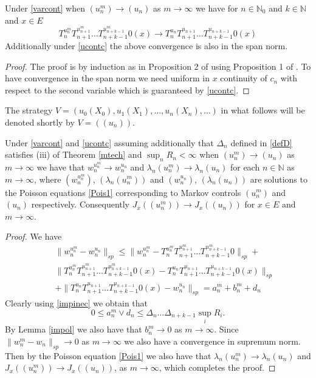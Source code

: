 \documentclass[10pt,english]{extarticle}
\begin{document}
\begin{lemma}\label{impol}
Under \eqref{varcont}  when $(u_n^m)\to (u_n)$ as $m\to \infty$ we have for $n\in \mathbb{N}_0$ and $k\in \mathbb{N}$ and $x\in E$
\begin{equation}
T_n^{u_n^m}T_{n+1}^{u_{n+1}^m}\ldots T_{n+k-1}^{u_{n+k-1}^m}0(x) \to T_n^{u_n}T_{n+1}^{u_{n+1}}\ldots T_{n+k-1}^{u_{n+k-1}}0(x)
\end{equation}
Additionally under \eqref{ucontc} the above convergence is also in the span norm.
\end{lemma}
\begin{proof} The proof is by induction as in Proposition 2 of \cite{Ste2024} using Proposition 1 of \cite{Ste2024}. To have convergence in the span norm we need uniform in $x$ continuity of $c_n$ with respect to the second variable which is guaranteed by \eqref{ucontc}.
\end{proof}
The strategy $V=(u_0(X_0),u_1(X_1),\ldots,u_n(X_n),\ldots)$ in what follows will be denoted shortly by $V=((u_n))$.
\begin{theorem} Under \eqref{varcont} and \eqref{ucontc} assuming additionally that $\Delta_n$ defined in \eqref{defD} satisfies (iii) of Theorem \ref{mtech} and $\sup_n R_n<\infty$ when  $(u_n^m)\to (u_n)$ as $m\to \infty$ we have that
$w_n^{u_n^m}\to w_n^{u_n}$ and $\lambda_n(u_n^m)\to \lambda_n(u_n)$ for each $n\in \mathbb{N}$ as $m\to \infty$, where $(w_n^{u_n^m})$, $(\lambda_n(u_n^m))$ and $(w_n^{u_n})$, $(\lambda_n(u_n))$ are solutions to the Poisson equations \eqref{Pois1} corresponding to Markov controls $(u_n^m)$ and $(u_n)$ respectively. Consequently  $J_x((u_n^m))\to J_x((u_n))$ for $x\in E$ and $m\to \infty$.
\end{theorem}
 \begin{proof}
We have
\begin{eqnarray}\label{os1}
&&\|w_n^{u_n^m}-w_n^{u_n}\|_{sp}\leq \|w_n^{u_n^m}-T_n^{u_n^m}T_{n+1}^{u_{n+1}^m}\ldots T_{n+k-1}^{u_{n+k-1}^m}0\|_{sp} + \nonumber \\
&&\|T_n^{u_n^m}T_{n+1}^{u_{n+1}^m}\ldots T_{n+k-1}^{u_{n+k-1}^m}0(x)- T_n^{u_n}T_{n+1}^{u_{n+1}}\ldots T_{n+k-1}^{u_{n+k-1}}0(x)\|_{sp} \nonumber \\
&&+\|T_n^{u_n}T_{n+1}^{u_{n+1}}\ldots T_{n+k-1}^{u_{n+k-1}}0(x)-w_n^{u_n}\|_{sp}= a_n^m+b_n^m+d_n
\end{eqnarray}
Clearly using \eqref{impinec} we obtain that
\begin{equation}\label{os2}
0\leq a_n^m \vee d_n \leq  \Delta_n\ldots \Delta_{n+k-1}\sup_i R_i.
\end{equation}
By Lemma \ref{impol} we also have that $b_n^m\to 0$ as $m\to \infty$.
Since $\|w_n^m-w_n\|_{sp}\to 0$ as $m\to \infty$ we also have a convergence in supremum norm. Then by the Poisson equation \eqref{Pois1} we also have that $\lambda_n(u_n^m)\to \lambda_n(u_n)$
and $J_x((u_n^m))\to J_x((u_n))$, as $m\to \infty$, which completes the proof.
\end{proof}
\end{document}

